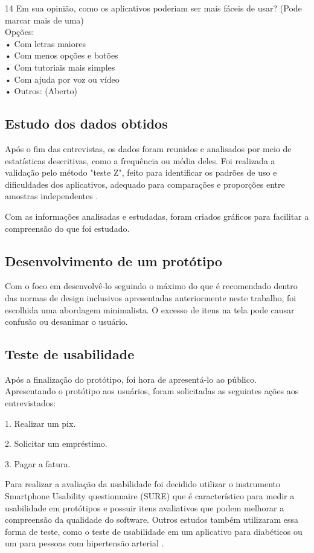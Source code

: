 14 Em sua opinião, como os aplicativos poderiam ser mais fáceis de usar?
(Pode marcar mais de uma)\\
Opções:\\
• Com letras maiores\\
• Com menos opções e botões\\
• Com tutoriais mais simples\\
• Com ajuda por voz ou vídeo\\
• Outros: (Aberto)\\

\subsection*{Estudo dos dados obtidos}

Após o fim das entrevistas, os dados foram reunidos e analisados por meio de estatísticas descritivas, como a frequência ou média deles. Foi realizada a validação pelo método "teste Z", feito para identificar os padrões de uso e dificuldades dos aplicativos, adequado para comparações e proporções entre amostras independentes \citep{moore2010statistics}.

Com as informações analisadas e estudadas, foram criados gráficos para facilitar a compreensão do que foi estudado.

\subsection*{Desenvolvimento de um protótipo}

Com o foco em desenvolvê-lo seguindo o máximo do que é recomendado dentro das normas de design inclusivos apresentadas anteriormente neste trabalho, foi escolhida uma abordagem minimalista. O excesso de itens na tela pode causar confusão ou desanimar o usuário.

\subsection*{Teste de usabilidade}

Após a finalização do protótipo, foi hora de apresentá-lo ao público. Apresentando o protótipo aos usuários, foram solicitadas as seguintes ações aos entrevistados:

1. Realizar um pix.

2. Solicitar um empréstimo.

3. Pagar a fatura.

Para realizar a avaliação da usabilidade foi decidido utilizar o instrumento Smartphone Usability questionnaire (SURE) \citep{wangenheim2014sure} que é característico para medir a usabilidade em protótipos e possuir itens avaliativos que podem melhorar a compreensão da qualidade do software. Outros estudos também utilizaram essa forma de teste, como o teste de usabilidade em um aplicativo para diabéticos \citep{marques2020usability} ou um para pessoas com hipertensão arterial \citep{silva2024quali}.

